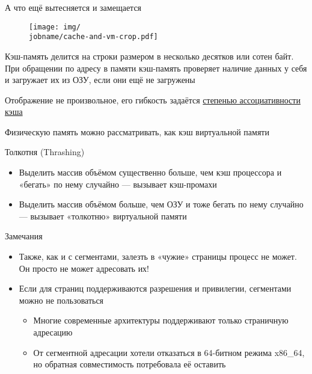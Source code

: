 \documentclass[xetex,aspectratio=43]{beamer}
\begin{document}
\begin{frame}{А что ещё вытесняется и замещается}

        \begin{figure}
            \texttt{[image: img/\\jobname/cache-and-vm-crop.pdf]}
        \end{figure}


        Кэш-память делится на строки размером в несколько десятков или сотен
        байт. При обращении по адресу в памяти кэш-память проверяет наличие
        данных у себя и загружает их из ОЗУ, если они ещё не загружены

        Отображение не произвольное, его гибкость задаётся
        \href{https://en.wikipedia.org/wiki/Cache_placement_policies}{степенью ассоциативности кэша}

        \pause

        Физическую память можно рассматривать, как кэш виртуальной памяти
\end{frame}

\begin{frame}{Толкотня (Thrashing)}
        \begin{itemize}
            \item
            Выделить массив объёмом существенно больше, чем кэш процессора и
            «бегать» по нему случайно --- вызывает кэш-промахи
            \item
            Выделить массив объёмом больше, чем ОЗУ и тоже бегать по нему случайно
            --- вызывает «толкотню» виртуальной памяти
        \end{itemize}
\end{frame}

\begin{frame}{Замечания}
    \begin{itemize}
        \item
        Также, как и с сегментами, залезть в «чужие» страницы процесс не
        может. Он просто не может адресовать их!
        \item
        Если для страниц поддерживаются разрешения и привилегии, сегментами
        можно не пользоваться

        \begin{itemize}
            \item
            Многие современные архитектуры поддерживают только страничную
            адресацию
            \item
            От сегментной адресации хотели отказаться в 64-битном режима
            x86\_64, но обратная совместимость потребовала её оставить
        \end{itemize}
    \end{itemize}
\end{frame}
\end{document}
